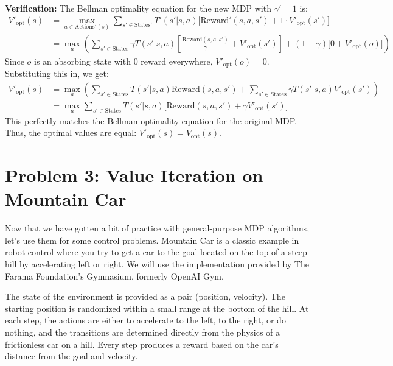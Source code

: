 \documentclass{article}
\theoremstyle{case}
\theoremstyle{definition}
\begin{document}
\begin{enumerate}
\begin{shaded}
    \textbf{Verification:}
    The Bellman optimality equation for the new MDP with $\gamma' = 1$ is:
    \begin{align*}
    V'_{\text{opt}}(s) &= \max_{a \in \text{Actions}'(s)} \sum_{s' \in \text{States}'} T'(s'|s,a) \Big[ \text{Reward}'(s,a,s') + 1 \cdot V'_{\text{opt}}(s') \Big] \\
    &= \max_{a} \left( \sum_{s' \in \text{States}} \gamma T(s'|s,a) \left[ \frac{\text{Reward}(s,a,s')}{\gamma} + V'_{\text{opt}}(s') \right] + (1-\gamma) \Big[ 0 + V'_{\text{opt}}(o) \Big] \right)
    \end{align*}
    Since $o$ is an absorbing state with $0$ reward everywhere, $V'_{\text{opt}}(o) = 0$. Substituting this in, we get:
    \begin{align*}
    V'_{\text{opt}}(s) &= \max_{a} \left( \sum_{s' \in \text{States}} T(s'|s,a) \text{Reward}(s,a,s') + \sum_{s' \in \text{States}} \gamma T(s'|s,a) V'_{\text{opt}}(s') \right) \\
    &= \max_{a} \sum_{s' \in \text{States}} T(s'|s,a) \Big[ \text{Reward}(s,a,s') + \gamma V'_{\text{opt}}(s') \Big]
    \end{align*}
    This perfectly matches the Bellman optimality equation for the original MDP. Thus, the optimal values are equal: $V'_{\text{opt}}(s) = V_{\text{opt}}(s)$.

    \end{shaded}
\end{enumerate}

\newpage

\section*{Problem 3: Value Iteration on Mountain Car}

Now that we have gotten a bit of practice with general-purpose MDP algorithms, let's use them for some control problems.
Mountain Car is a classic example in robot control where you try to get a car to the goal located on the top of a steep hill by accelerating left or right.
We will use the implementation provided by The Farama Foundation's Gymnasium, formerly OpenAI Gym.

The state of the environment is provided as a pair (position, velocity).
The starting position is randomized within a small range at the bottom of the hill. At each step, the actions are either to accelerate to the left, to the right, or do nothing, and the transitions are
determined directly from the physics of a frictionless car on a hill. Every step produces a reward based on the car's distance from the goal and velocity.
\end{document}

